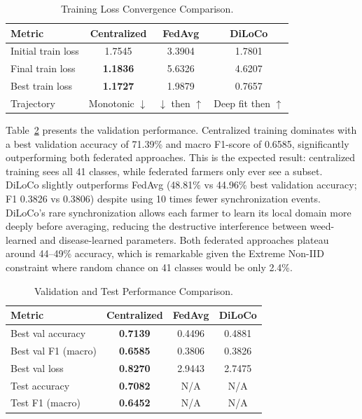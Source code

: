 \documentclass[conference, compsoc, twoside]{IEEEtran}
\begin{document}
\begin{table}[ht]
\centering
\caption{Training Loss Convergence Comparison. \medskip}
\label{tab:training_loss}
\small
\begin{tabular}{ l  c  c  c }
\hline
Metric & Centralized & FedAvg & DiLoCo \\
\hline
Initial train loss & 1.7545 & 3.3904 & 1.7801 \\
Final train loss & \textbf{1.1836} & 5.6326 & 4.6207 \\
Best train loss & \textbf{1.1727} & 1.9879 & 0.7657 \\
Trajectory & Monotonic $\downarrow$ & $\downarrow$ then $\uparrow$ & Deep fit then $\uparrow$ \\
\hline
\end{tabular}
\end{table}

Table~\ref{tab:val_performance} presents the validation performance. Centralized training dominates with a best validation accuracy of 71.39\% and macro F1-score of 0.6585, significantly outperforming both federated approaches. This is the expected result: centralized training sees all 41 classes, while federated farmers only ever see a subset. DiLoCo slightly outperforms FedAvg (48.81\% vs 44.96\% best validation accuracy; F1 0.3826 vs 0.3806) despite using 10 times fewer synchronization events. DiLoCo's rare synchronization allows each farmer to learn its local domain more deeply before averaging, reducing the destructive interference between weed-learned and disease-learned parameters. Both federated approaches plateau around 44--49\% accuracy, which is remarkable given the Extreme Non-IID constraint where random chance on 41 classes would be only 2.4\%.

\begin{table}[ht]
\centering
\caption{Validation and Test Performance Comparison. \medskip}
\label{tab:val_performance}
\small
\begin{tabular}{ l  c  c  c }
\hline
Metric & Centralized & FedAvg & DiLoCo \\
\hline
Best val accuracy & \textbf{0.7139} & 0.4496 & 0.4881 \\
Best val F1 (macro) & \textbf{0.6585} & 0.3806 & 0.3826 \\
Best val loss & \textbf{0.8270} & 2.9443 & 2.7475 \\
Test accuracy & \textbf{0.7082} & N/A & N/A \\
Test F1 (macro) & \textbf{0.6452} & N/A & N/A \\
\hline
\end{tabular}
\end{table}
\end{document}

